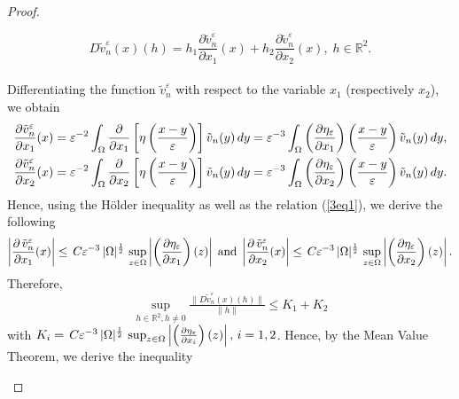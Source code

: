 \documentclass[11pt]{article}
\begin{document}
\begin{proof}
\begin{enumerate}
		$$D\tilde{v}_{n}^{\varepsilon}(x)(h)=h_1\frac{\partial \tilde{v}_{n}^{\varepsilon}}{\partial x_1} (x)+h_2\frac{\partial \tilde{v}_{n}^{\varepsilon}}{\partial x_2} (x),\;h\in\mathbb{R}^2.$$  \\
		Differentiating the function $\tilde{v}_{n}^{\varepsilon}$  with respect to the variable $x_1$ (respectively $x_2$), we obtain
		\begin{eqnarray*}
			\frac{\partial \tilde{v}_{n}^{\varepsilon}}{\partial x_1} (x)= \varepsilon^{-2} \int_\Omega \frac{\partial}{ \partial x_1}\left[ \eta\left( \frac{x-y}{\varepsilon} \right)\right] \tilde{v}_n(y) \,dy & = \varepsilon^{-3} \int_\Omega \left({\partial \eta_{\varepsilon}\over\partial x_1}\right)\left( \frac{x-y}{\varepsilon} \right) \tilde{v}_n(y) \,dy,\label{3eq2} \\
			\frac{\partial \tilde{v}_{n}^{\varepsilon}}{\partial x_2} (x)= \varepsilon^{-2} \int_\Omega \frac{\partial}{ \partial x_2} \left[\eta\left( \frac{x-y}{\varepsilon} \right)\right] \tilde{v}_n(y) \,dy & = \varepsilon^{-3} \int_\Omega \left({\partial \eta_{\varepsilon}\over\partial x_2}\right)\left( \frac{x-y}{\varepsilon} \right) \tilde{v}_n(y) \,dy.\label{3eq3}
		\end{eqnarray*} 
		Hence, using the {H\"older} inequality as well as  the relation (\ref{3eq1}), we derive the following
		\begin{equation}\label{3eq4} 
			\left| \frac{\partial\, \tilde{v}_{n}^{\varepsilon}}{\partial x_1} (x) \right| \leq \,C \varepsilon^{-3}\, |\Omega|^{\frac{1}{2}}\, \sup_{z \in \Omega} \left| \left({\partial \eta_{\varepsilon}\over\partial x_1}\right)(z) \right|\; \text{and}\;
			\left| \frac{\partial\, \tilde{v}_{n}^{\varepsilon}}{\partial x_2} (x) \right| \leq  \,C \varepsilon^{-3}\, |\Omega|^{\frac{1}{2}}\,\sup_{z \in \Omega} \left| \left({\partial \eta_{\varepsilon}\over\partial x_2}\right)(z) \right|.
		\end{equation}
		Therefore, \[\sup_{h\in\mathbb{R}^2,h\neq 0}\tfrac{\|D\tilde{v}_{n}^{\varepsilon}(x)(h)\|}{\|h\|}\leq K_1+K_2\] with $K_i=\,C \varepsilon^{-3}\, |\Omega|^{\frac{1}{2}}\,\sup_{z \in \Omega} \left| \left({\partial \eta_{\varepsilon}\over\partial x_i}\right)(z) \right|,\,i=1,2$. {Hence, by the Mean Value Theorem, we derive the inequality}
		

\end{enumerate}
\end{proof}
\end{document}
